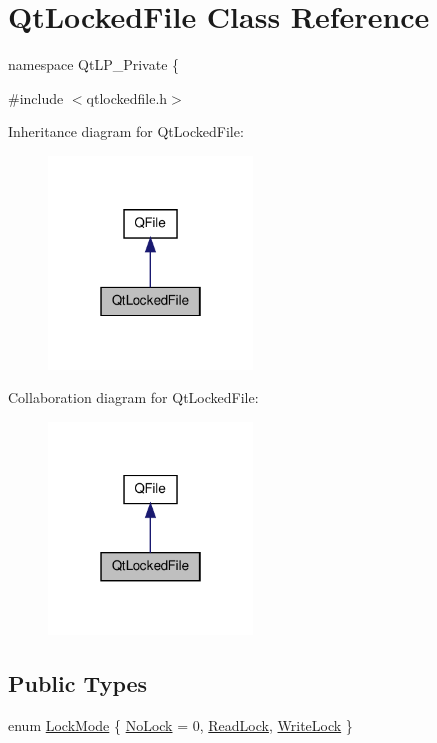 \hypertarget{class_qt_locked_file}{\section{Qt\-Locked\-File Class Reference}
\label{class_qt_locked_file}
}


namespace Qt\-L\-P\-\_\-\-Private \{  




{\ttfamily \#include $<$qtlockedfile.\-h$>$}



Inheritance diagram for Qt\-Locked\-File\-:
\nopagebreak
\begin{figure}[H]
\begin{center}
\leavevmode
\includegraphics[width=154pt]{class_qt_locked_file__inherit__graph}
\end{center}
\end{figure}


Collaboration diagram for Qt\-Locked\-File\-:
\nopagebreak
\begin{figure}[H]
\begin{center}
\leavevmode
\includegraphics[width=154pt]{class_qt_locked_file__coll__graph}
\end{center}
\end{figure}
\subsection*{Public Types}
\begin{DoxyCompactItemize}
\item 
enum \hyperlink{class_qt_locked_file_aef385609a0a280b52334b972b04074cc}{Lock\-Mode} \{ \hyperlink{class_qt_locked_file_aef385609a0a280b52334b972b04074ccaecfd72691ebf45adb30ced8f2ce083ba}{No\-Lock} = 0, 
\hyperlink{class_qt_locked_file_aef385609a0a280b52334b972b04074ccaa7d019059a9ef326be5f044dc7b411b7}{Read\-Lock}, 
\hyperlink{class_qt_locked_file_aef385609a0a280b52334b972b04074cca780a3a586dde80736c8fe2e6c5d3cc8d}{Write\-Lock}
 \}
\end{DoxyCompactItemize}
